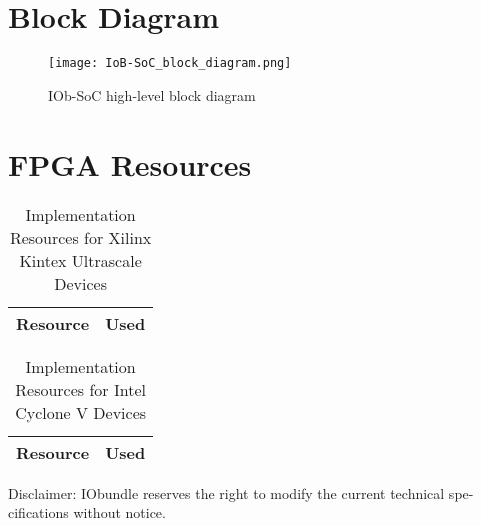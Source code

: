 \documentclass[twocolumn]{iob_pb}
\begin{document}
\section*{\textcolor[rgb]{0,0,0}{Block Diagram}}

\begin{figure}[H]
  \begin{center}
    \texttt{[image: IoB-SoC\_block\_diagram.png]}
    \caption{IOb-SoC high-level block diagram}
    \label{fig:IOb-SoC}
  \end{center}
\end{figure}




\section*{FPGA Resources}

\ifnum{}
\begin{table}[H]
  \begin{center}
    \begin{tabular}{|l|r|}
      \hline
%      
      \rowcolor{iob-green}
      \textbf{Resource}  & \textbf{Used} \\
      \hline
      \hline

       

    \end{tabular}
    \caption{Implementation Resources for Xilinx Kintex Ultrascale Devices}
    \label{tab:res-xil}
  \end{center}
\end{table}
\fi


\ifnum{}
\begin{table}[H]
  \begin{center}
    \begin{tabular}{|l|r|}
      \hline

      \rowcolor{iob-green}
      \textbf{Resource}  & \textbf{Used} \\
      \hline
      \hline

       
        
    \end{tabular}
    \caption{Implementation Resources for Intel Cyclone V Devices}
    \label{tab:res-alt}
  \end{center}
\end{table}
\fi

\vspace*{0.5cm}
\noindent
\begin{scriptsize}
Disclaimer: IObundle reserves the right to modify the current
technical spe-cifications without notice.
\end{scriptsize}
\newpage
\end{document}
